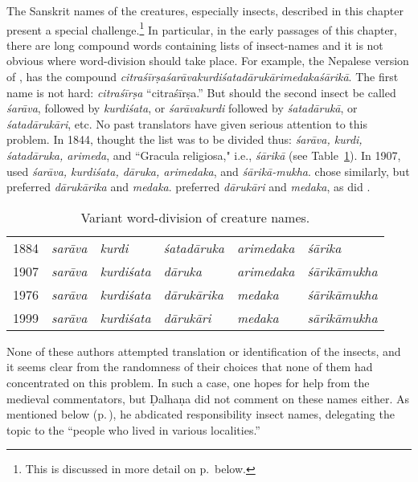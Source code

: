 The Sanskrit names of the creatures, especially insects, described in
this chapter present a special challenge.\footnote{This is discussed
    in more detail on p.\,\pageref{insectnames} below.}  In particular, in
    the early passages of this chapter, there are long compound words
    containing lists of insect-names and it is not obvious where
    word-division should take place.  For example, the Nepalese version of
    , has the compound
    \emph{citra\-śīrṣa\-śarāva\-kurdi\-śata\-dāru\-kāri\-medaka\-śārikā}.
    The first name is not hard: \emph{citraśīrṣa} “\Gls{citraśīrṣa}.”  But
    should the second insect be called \emph{śarāva}, followed by
    \emph{kurdiśata}, or \emph{śarāvakurdi} followed by \emph{śatadārukā},
    or \emph{śatadārukāri}, etc.  No past translators have given serious
    attention to this problem.  In 1844, \citet[219]{hess-1855} thought
    the list was to be divided thus: \emph{śarāva, kurdi, śatadāruka,
        arimeda}, and “Gracula religiosa," i.e., \emph{śārikā}  (see 
        Table~\ref{worddivision}). 
    In 1907, \citet[v.\,2, 696]{bhis-1907} used \emph{śarāva,
        kurdiśata, dāruka, arimedaka}, and \emph{śārikā-mukha}. 
    \citet[56]{sing-1976} chose similarly, but preferred
    \emph{dārukārika} and \emph{medaka}. \citet[v.\,3, 27]{shar-1999}
    preferred \emph{dārukāri} and \emph{medaka}, as did
    \citet[608]{vali-2007}.
\begin{table}
    \centering
        \begin{tabular}{l>{\em}l>{\em}l>{\em}l>{\em}l>{\em}l}
        \toprule
        1884 & sarāva & kurdi & śatadāruka & arimedaka & śārika \\      
        1907 & sarāva & kurdiśata & dāruka & arimedaka & śārikāmukha \\
        1976 & sarāva & kurdiśata & dārukārika & medaka & śārikāmukha \\
        1999 & sarāva & kurdiśata & dārukāri & medaka & sārikāmukha \\
        \bottomrule 
    \end{tabular}        
    \caption{Variant word-division of creature names.}
    \label{worddivision}
\end{table}    
    None of these authors attempted
    translation or identification of the insects, and it seems clear
    from the randomness of their choices that none of them had
    concentrated on this problem.  In such a case, one hopes for help
    from the medieval commentators, but Ḍalhaṇa did not comment on
    these names either.  As mentioned below
    (p.\,\pageref{insectnames}), he abdicated responsibility insect
    names, delegating the topic to the “people who lived in various
    localities.”
    
